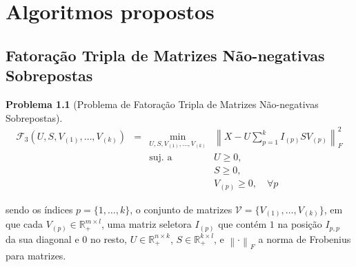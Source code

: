 \documentclass[
    12pt,                %
    oneside,            %
    a4paper,            %
    english,            %
    brazil                %
    ]{abntex2ppgsi}
\newtheorem{problem}{Problema}
\newcommand{\norm}[1]{\left\lVert#1\right\rVert}
\begin{document}

\chapter{Algoritmos propostos}
\label{ch:proposedalgs}

\section{Fatoração Tripla de Matrizes Não-negativas Sobrepostas}

\begin{problem}[Problema de Fatoração Tripla de Matrizes Não-negativas Sobrepostas]
\label{def:ovnmtf:problem}
\begin{equation}
    \begin{array}{lclc}
        \displaystyle \mathcal{F}_3(U, S, V_{(1)}, \dots, V_{(k)}) & = & \displaystyle \min_{U, S, V_{(1)}, \dots, V_{(k)}} & \norm{X - U\sum_{p=1}^{k}I_{(p)}SV_{(p)}}^{2}_{F} \\
                                                                   &   & \text{suj. a}                & U \geq 0, \\
                                                                   &   &                              & S \geq 0, \\
                                                                   &   &                              & V_{(p)} \geq 0, \quad \forall p
    \end{array}
\end{equation}
\end{problem}

sendo os índices $p = \{1, \dots, k\}$, o conjunto de matrizes $\mathcal{V} = \{ V_{(1)}, \dots, V_{(k)} \}$, em que cada $V_{(p)} \in \mathbb{R}^{m \times l}_{+}$, uma matriz seletora $I_{(p)}$ que contém $1$ na posição $I_{p,p}$ da sua diagonal e $0$ no resto, $U \in \mathbb{R}^{n \times k}_{+}$, $S \in \mathbb{R}^{k \times l}_{+}$, e $\norm{\cdot}_F$ a norma de Frobenius para matrizes.
\end{document}
